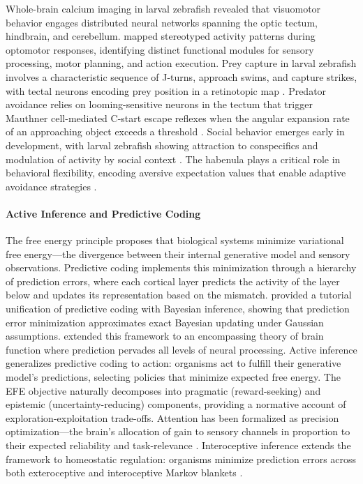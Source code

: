 \documentclass[12pt]{article}
\begin{document}
Whole-brain calcium imaging in larval zebrafish
\citep{ahrens2013} revealed that visuomotor behavior engages
distributed neural networks spanning the optic tectum, hindbrain,
and cerebellum.
\citet{portugues2014} mapped stereotyped activity patterns during
optomotor responses, identifying distinct functional modules for
sensory processing, motor planning, and action execution.
Prey capture in larval zebrafish involves a characteristic sequence
of J-turns, approach swims, and capture strikes, with tectal neurons
encoding prey position in a retinotopic map
\citep{bianco2015}.
Predator avoidance relies on looming-sensitive neurons in the tectum
that trigger Mauthner cell-mediated C-start escape reflexes when the
angular expansion rate of an approaching object exceeds a threshold
\citep{temizer2015,dunn2016}.
Social behavior emerges early in development, with larval zebrafish
showing attraction to conspecifics and modulation of activity by
social context \citep{dreosti2015}.
The habenula plays a critical role in behavioral flexibility, encoding
aversive expectation values that enable adaptive avoidance strategies
\citep{amo2014,jesuthasan2012}.

\paragraph{Active Inference and Predictive Coding}

The free energy principle \citep{friston2010} proposes that biological
systems minimize variational free energy---the divergence between their
internal generative model and sensory observations.
Predictive coding \citep{rao1999} implements this minimization through
a hierarchy of prediction errors, where each cortical layer predicts
the activity of the layer below and updates its representation based
on the mismatch.
\citet{bogacz2017} provided a tutorial unification of predictive coding
with Bayesian inference, showing that prediction error minimization
approximates exact Bayesian updating under Gaussian assumptions.
\citet{clark2013} extended this framework to an encompassing theory
of brain function where prediction pervades all levels of neural
processing.
Active inference \citep{friston2017,parr2022} generalizes predictive
coding to action: organisms act to fulfill their generative model's
predictions, selecting policies that minimize expected free energy.
The EFE objective naturally decomposes into pragmatic (reward-seeking)
and epistemic (uncertainty-reducing) components, providing a normative
account of exploration-exploitation trade-offs.
Attention has been formalized as precision optimization---the brain's
allocation of gain to sensory channels in proportion to their expected
reliability and task-relevance \citep{feldman2010}.
Interoceptive inference extends the framework to homeostatic regulation:
organisms minimize prediction errors across both exteroceptive and
interoceptive Markov blankets \citep{seth2016,barrett2015,pezzulo2015}.
\end{document}
